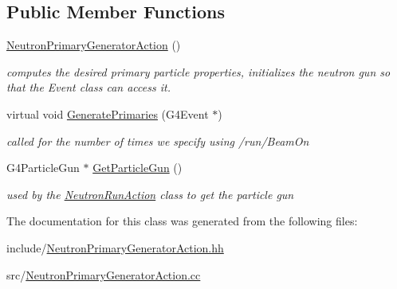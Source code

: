 \subsection*{Public Member Functions}
\begin{DoxyCompactItemize}
\item 
\mbox{\label{classNeutronPrimaryGeneratorAction_a58464b853d6e69d3a631dd1ce70e68aa}} 
\hyperlink{classNeutronPrimaryGeneratorAction_a58464b853d6e69d3a631dd1ce70e68aa}{Neutron\+Primary\+Generator\+Action} ()
\begin{DoxyCompactList}\small\item\em computes the desired primary particle properties, initializes the neutron gun so that the Event class can access it. \end{DoxyCompactList}\item 
\mbox{\label{classNeutronPrimaryGeneratorAction_afa37cc6fbe070f397780f5da1b4b015d}} 
virtual void \hyperlink{classNeutronPrimaryGeneratorAction_afa37cc6fbe070f397780f5da1b4b015d}{Generate\+Primaries} (G4\+Event $\ast$)
\begin{DoxyCompactList}\small\item\em called for the number of times we specify using /run/\+Beam\+On \end{DoxyCompactList}\item 
\mbox{\label{classNeutronPrimaryGeneratorAction_a34bc9633aaaf6d123a9bd59fb736732b}} 
G4\+Particle\+Gun $\ast$ \hyperlink{classNeutronPrimaryGeneratorAction_a34bc9633aaaf6d123a9bd59fb736732b}{Get\+Particle\+Gun} ()
\begin{DoxyCompactList}\small\item\em used by the \hyperlink{classNeutronRunAction}{Neutron\+Run\+Action} class to get the particle gun \end{DoxyCompactList}\end{DoxyCompactItemize}


The documentation for this class was generated from the following files\+:\begin{DoxyCompactItemize}
\item 
include/\hyperlink{NeutronPrimaryGeneratorAction_8hh}{Neutron\+Primary\+Generator\+Action.\+hh}\item 
src/\hyperlink{NeutronPrimaryGeneratorAction_8cc}{Neutron\+Primary\+Generator\+Action.\+cc}\end{DoxyCompactItemize}
